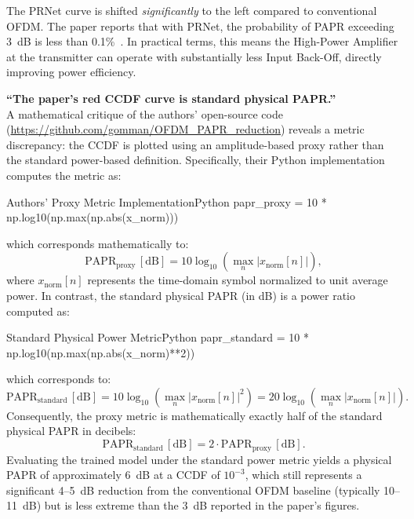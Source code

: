 The PRNet curve is shifted \emph{significantly} to the left compared to conventional OFDM.  The paper reports that with PRNet, the probability of PAPR exceeding 3~dB is less than 0.1\%~\cite{kim2017novel}.  In practical terms, this means the High-Power Amplifier at the transmitter can operate with substantially less Input Back-Off, directly improving power efficiency.

\begin{misconception}
    \textbf{``The paper's red CCDF curve is standard physical PAPR.''} \\
    A mathematical critique of the authors' open-source code (\url{https://github.com/gomman/OFDM_PAPR_reduction}) reveals a metric discrepancy: the CCDF is plotted using an amplitude-based proxy rather than the standard power-based definition. Specifically, their Python implementation computes the metric as:
    \begin{codelisting}[numbers=none]{Authors' Proxy Metric Implementation}{Python}
        papr_proxy = 10 * np.log10(np.max(np.abs(x_norm)))
    \end{codelisting}
    which corresponds mathematically to:
    \begin{equation*}
        \mathrm{PAPR}_{\mathrm{proxy}}\,\mathrm{[dB]} = 10\log_{10}\left(\max_{n} \lvert x_{\mathrm{norm}}[n] \rvert\right),
    \end{equation*}
    where $x_{\mathrm{norm}}[n]$ represents the time-domain symbol normalized to unit average power. In contrast, the standard physical PAPR (in dB) is a power ratio computed as:
    \begin{codelisting}[numbers=none]{Standard Physical Power Metric}{Python}
        papr_standard = 10 * np.log10(np.max(np.abs(x_norm)**2))
    \end{codelisting}
    which corresponds to:
    \begin{equation*}
        \mathrm{PAPR}_{\mathrm{standard}}\,\mathrm{[dB]} = 10\log_{10}\left(\max_{n} \lvert x_{\mathrm{norm}}[n] \rvert^2\right) = 20\log_{10}\left(\max_{n} \lvert x_{\mathrm{norm}}[n] \rvert\right).
    \end{equation*}
    Consequently, the proxy metric is mathematically exactly half of the standard physical PAPR in decibels:
    \begin{equation*}
        \mathrm{PAPR}_{\mathrm{standard}}\,\mathrm{[dB]} = 2 \cdot \mathrm{PAPR}_{\mathrm{proxy}}\,\mathrm{[dB]}.
    \end{equation*}
    Evaluating the trained model under the standard power metric yields a physical PAPR of approximately 6~dB at a CCDF of $10^{-3}$, which still represents a significant 4--5~dB reduction from the conventional OFDM baseline (typically 10--11~dB) but is less extreme than the 3~dB reported in the paper's figures.


\end{misconception}
